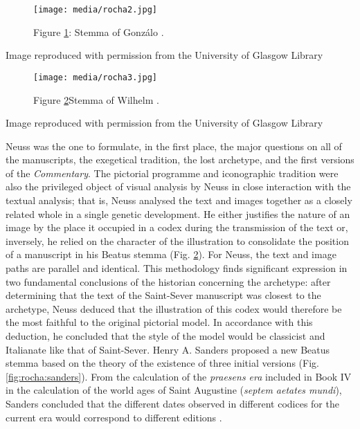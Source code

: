 \documentclass{article}
\begin{document}
\begin{figure}[H]
    \centering
        \texttt{[image: media/rocha2.jpg]}
        \caption{Figure \ref{fig:rocha:pidal}: Stemma of Gonzálo \citet{menendez_mozarabes_1954}.}
        \label{fig:rocha:pidal}
    \end{figure}


 Image reproduced with permission from the University of Glasgow Library 


 
    \begin{figure}
        \texttt{[image: media/rocha3.jpg]}
        \caption{Figure \ref{fig:rocha:neuss}Stemma of Wilhelm \citet{neuss_apokalypse_1931}.}
        \label{fig:rocha:neuss}
\end{figure}


 Image reproduced with permission from the University of Glasgow Library 


 
Neuss was the one to formulate, in the first place, the major questions
on all of the manuscripts, the exegetical tradition, the lost archetype,
and the first versions of the \emph{Commentary}. The pictorial programme
and iconographic tradition were also the privileged object of visual
analysis by Neuss in close interaction with the textual analysis; that
is, Neuss analysed the text and images together as a closely related
whole in a single genetic development. He either justifies the nature of
an image by the place it occupied in a codex during the transmission of
the text or, inversely, he relied on the character of the illustration
to consolidate the position of a manuscript in his Beatus stemma
(Fig. \ref{fig:rocha:neuss}). For Neuss, the text and image paths are parallel and
identical. This methodology finds significant expression in two
fundamental conclusions of the historian concerning the archetype: after
determining that the text of the Saint-Sever manuscript was closest to
the archetype, Neuss deduced that the illustration of this codex would
therefore be the most faithful to the original pictorial model. In
accordance with this deduction, he concluded that the style of the model
would be classicist and Italianate like that of Saint-Sever. Henry A.
Sanders proposed a new Beatus stemma based on the theory of the
existence of three initial versions (Fig. \ref{fig:rocha:sanders}). From the calculation of
the \emph{praesens era} included in Book IV in the calculation of the
world ages of Saint Augustine (\emph{septem aetates mundi}), Sanders
concluded that the different dates observed in different codices for the
current era would correspond to different editions \citep[1:165--167]{noauthor_actas_1978}.
\end{document}

